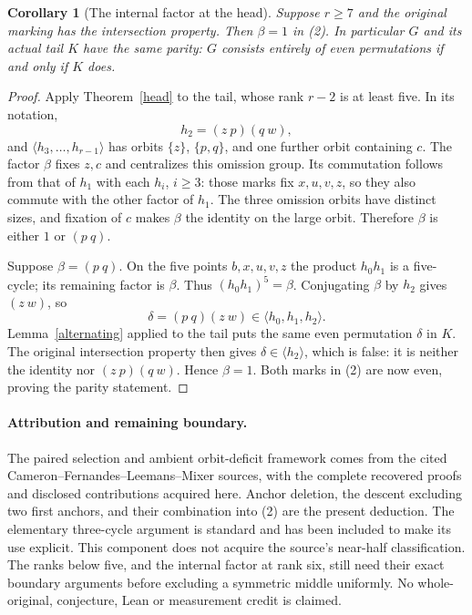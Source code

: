 \documentclass[11pt,a4paper]{article}
\newtheorem{corollary}[lemma]{Corollary}
\newcommand{\gen}[1]{\langle#1\rangle}
\begin{document}
\begin{corollary}[The internal factor at the head]\label{beta}
Suppose $r\ge7$ and the original marking has the intersection
property. Then $\beta=1$ in (2). In particular $G$ and its
actual tail $K$ have the same parity: $G$ consists entirely of
even permutations if and only if $K$ does.
\end{corollary}
\begin{proof}
Apply Theorem~\ref{head} to the tail, whose rank $r-2$ is at
least five. In its notation,
\[
 h_2=(z\ p)(q\ w),
\]
and $\gen{h_3,\ldots,h_{r-1}}$ has orbits $\{z\}$, $\{p,q\}$,
and one further orbit containing $c$. The factor $\beta$ fixes
$z,c$ and centralizes this omission group. Its commutation follows
from that of $h_1$ with each $h_i$, $i\ge3$: those marks fix
$x,u,v,z$, so they also commute with the other factor of $h_1$.
The three omission orbits have distinct sizes, and fixation of
$c$ makes $\beta$ the identity on the large orbit. Therefore
$\beta$ is either $1$ or $(p\ q)$.

Suppose $\beta=(p\ q)$. On the five points $b,x,u,v,z$ the
product $h_0h_1$ is a five-cycle; its remaining factor is $\beta$.
Thus $(h_0h_1)^5=\beta$. Conjugating $\beta$ by $h_2$ gives
$(z\ w)$, so
\[
                \delta=(p\ q)(z\ w)\in\gen{h_0,h_1,h_2}.
\]
Lemma~\ref{alternating} applied to the tail puts the same even
permutation $\delta$ in $K$. The original intersection property
then gives $\delta\in\gen{h_2}$, which is false: it is neither
the identity nor $(z\ p)(q\ w)$. Hence $\beta=1$. Both marks
in (2) are now even, proving the parity statement.
\end{proof}

\paragraph{Attribution and remaining boundary.}
The paired selection and ambient orbit-deficit framework comes from
the cited Cameron--Fernandes--Leemans--Mixer sources, with the complete
recovered proofs and disclosed contributions acquired here. Anchor
deletion, the descent excluding two first anchors, and their combination
into (2) are the present deduction. The elementary three-cycle argument
is standard and has been included to make its use explicit.
This component does not acquire the source's near-half classification.
The ranks below five, and the internal factor at rank six, still need
their exact boundary arguments before excluding a symmetric middle
uniformly. No whole-original, conjecture, Lean or measurement credit
is claimed.
\end{document}
